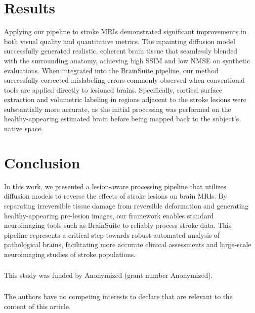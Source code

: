 \documentclass[runningheads]{llncs}
\begin{document}
\section{Results}


Applying our pipeline to stroke MRIs demonstrated significant improvements in both visual quality and quantitative metrics. The inpainting diffusion model successfully generated realistic, coherent brain tissue that seamlessly blended with the surrounding anatomy, achieving high SSIM and low NMSE on synthetic evaluations. When integrated into the BrainSuite pipeline, our method successfully corrected mislabeling errors commonly observed when conventional tools are applied directly to lesioned brains. Specifically, cortical surface extraction and volumetric labeling in regions adjacent to the stroke lesions were substantially more accurate, as the initial processing was performed on the healthy-appearing estimated brain before being mapped back to the subject's native space.



\section{Conclusion}
In this work, we presented a lesion-aware processing pipeline that utilizes diffusion models to reverse the effects of stroke lesions on brain MRIs. By separating irreversible tissue damage from reversible deformation and generating healthy-appearing pre-lesion images, our framework enables standard neuroimaging tools such as BrainSuite to reliably process stroke data. This pipeline represents a critical step towards robust automated analysis of pathological brains, facilitating more accurate clinical assessments and large-scale neuroimaging studies of stroke populations.

\begin{credits}
\subsubsection{\ackname} This study was funded by Anonymized (grant number Anonymized).

\subsubsection{\discintname}
The authors have no competing interests to declare that are
relevant to the content of this article.
\end{credits}
\end{document}
